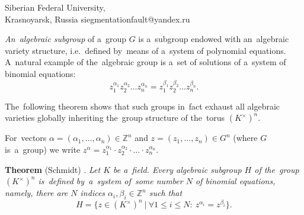 \documentclass[twoside]{article}
\begin{document}
\maketitBegin %

\author{Nikolay A. Mishko}
{Siberian Federal University,\\
Krasnoyarsk, Russia} {siegmentationfault@yandex.ru}





 \maketitEnd  %


\newcommand{\p}{\partial}
\renewcommand{\geq}{\geqslant}
\renewcommand{\leq}{\leqslant}
\renewcommand{\baselinestretch}{1}
\newtheorem {theorem}{Theorem}[section]
\newtheorem {rem}{Remark}[section]

\renewcommand{\thetheorem}{\arabic{section}.\arabic{theorem}}



\textit{An~algebraic subgroup} of a~group $G$ is a~subgroup endowed with an~algebraic variety structure,
i.e.~defined by~means of a~system of polynomial equations. A~natural example of the~algebraic group is a~set
of solutions of a~system of binomial equations:
$$
    z_1^{\alpha_1} z_2^{\alpha_2} \ldots z_n^{\alpha_n} = z_1^{\beta_1} z_2^{\beta_2} \ldots z_n^{\beta_n}.
$$

The~following theorem shows that such groups in~fact exhaust all algebraic varieties globally inheriting
the~group structure of the~torus $(K^\times)^n$.

For~vectors $\alpha = (\alpha_1, \ldots, \alpha_n) \in \mathbb{Z}^n$ and $z = (z_1, \ldots, z_n) \in G^n$ (where $G$ is~a~group)
we write $z^\alpha = z_1^{\alpha_1} \cdot z_2^{\alpha_2} \cdot \ldots \cdot z_n^{\alpha_n}$.

\medskip\noindent\textbf{Theorem} (Schmidt) \cite{Schm94}. \emph{Let $K$ be a~field. Every algebraic subgroup $H$
    of the~group $(K^{\times})^n$ is~defined by~a~system of~some number $N$ of binomial equations, namely,
    there are $N$ indices $\alpha_i, \beta_i \in \mathbb{Z}^n$ such that
    $$
        H = \{ z \in (K^{\times})^n\ |\ \forall 1 \leq i \leq N{:}\ z^{\alpha_i} = z^{\beta_i} \}.
    $$
}
\end{document}
